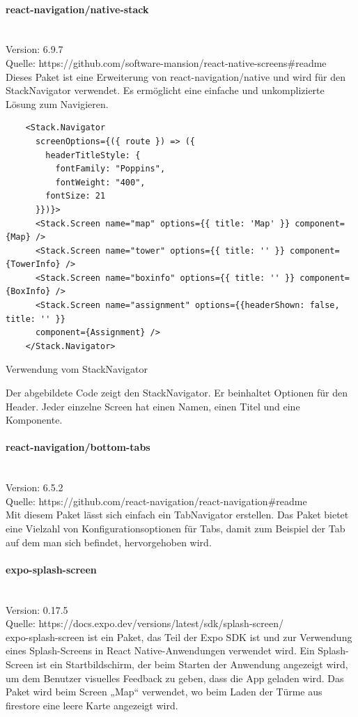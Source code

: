 \bigskip

\paragraph{react-navigation/native-stack}\mbox{}\\
Version: 6.9.7\\
Quelle: https://github.com/software-mansion/react-native-screens\#readme\\
Dieses Paket ist eine Erweiterung von react-navigation/native und wird für den StackNavigator verwendet. Es ermöglicht eine einfache und unkomplizierte Lösung zum Navigieren.

\begin{listing}[H]
  \begin{verbatim}
    <Stack.Navigator
      screenOptions={({ route }) => ({ 
        headerTitleStyle: {
          fontFamily: "Poppins",
          fontWeight: "400",
        fontSize: 21
      }})}>
      <Stack.Screen name="map" options={{ title: 'Map' }} component={Map} />
      <Stack.Screen name="tower" options={{ title: '' }} component={TowerInfo} />
      <Stack.Screen name="boxinfo" options={{ title: '' }} component={BoxInfo} />
      <Stack.Screen name="assignment" options={{headerShown: false, title: '' }} 
      component={Assignment} />
    </Stack.Navigator>
\end{verbatim}
  \caption{Verwendung vom StackNavigator}
  \label{lst:stacknavigator}
\end{listing}

Der abgebildete Code zeigt den StackNavigator. Er beinhaltet Optionen für den Header. Jeder einzelne Screen hat einen Namen, einen Titel und eine Komponente.

\bigskip

\paragraph{react-navigation/bottom-tabs}\mbox{}\\
Version: 6.5.2\\
Quelle: https://github.com/react-navigation/react-navigation\#readme\\
Mit diesem Paket lässt sich einfach ein TabNavigator erstellen. Das Paket bietet eine Vielzahl von Konfigurationsoptionen für Tabs, damit zum Beispiel der Tab auf dem man sich befindet, hervorgehoben wird.

\bigskip

\paragraph{expo-splash-screen}\mbox{}\\
Version: 0.17.5\\
Quelle: https://docs.expo.dev/versions/latest/sdk/splash-screen/\\
expo-splash-screen ist ein Paket, das Teil der Expo \ac{SDK} ist und zur Verwendung eines Splash-Screens in React Native-Anwendungen verwendet wird. Ein Splash-Screen ist ein Startbildschirm, der beim Starten der Anwendung angezeigt wird, um dem Benutzer visuelles Feedback zu geben, dass die App geladen wird.
\noindent Das Paket wird beim Screen „Map“ verwendet, wo beim Laden der Türme aus firestore eine leere Karte angezeigt wird.
